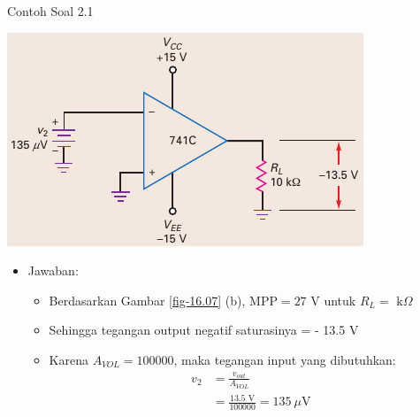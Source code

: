 \begin{frame}{Contoh Soal 2.1}
	\begin{multicols}{2}
		\begin{center}
			\includegraphics[width=\linewidth]{gambar/fig-16.11b}
		\end{center}
		\columnbreak
		\begin{itemize}
			\item Jawaban:
			\begin{itemize}
				\item Berdasarkan Gambar \ref{fig-16.07} (b), $ \text{MPP} = 27 \text{ V} $ untuk $ R_L = \text{ k}\Omega $
				\item Sehingga tegangan output negatif saturasinya = - 13.5 V
				\item Karena $ A_{VOL} = 100000 $, maka tegangan input yang dibutuhkan:
				\begin{align*}
					v_2 &= \frac{v_{out}}{A_{VOL}} \\
					&= \frac{13.5 \text{ V}}{100000} = 135 ~\mu\text{V}
				\end{align*}
			\end{itemize}
		\end{itemize}
	\end{multicols}
\end{frame}

